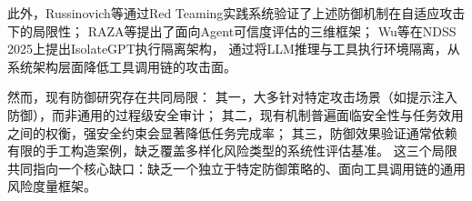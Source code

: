 此外，Russinovich等\cite{russinovich2025great}通过Red Teaming实践系统验证了上述防御机制在自适应攻击下的局限性；
RAZA等\cite{raza2025trism}提出了面向Agent可信度评估的三维框架；
Wu等\cite{wu2025isolategpt}在NDSS 2025上提出IsolateGPT执行隔离架构，
通过将LLM推理与工具执行环境隔离，从系统架构层面降低工具调用链的攻击面。

然而，现有防御研究存在共同局限：
其一，大多针对特定攻击场景（如提示注入防御），而非通用的过程级安全审计；
其二，现有机制普遍面临安全性与任务效用之间的权衡，强安全约束会显著降低任务完成率；
其三，防御效果验证通常依赖有限的手工构造案例，缺乏覆盖多样化风险类型的系统性评估基准。
这三个局限共同指向一个核心缺口：缺乏一个独立于特定防御策略的、面向工具调用链的通用风险度量框架。
